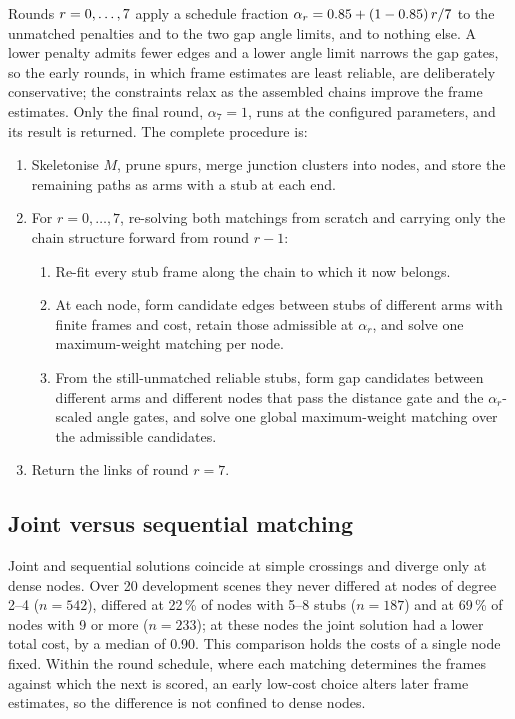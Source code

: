 Rounds $r=0,\ldots,\the\numexpr\PlectaParamRounds-1\relax$ apply a schedule fraction
$\alpha_r=\PlectaParamAnnealStart{}+(1-\PlectaParamAnnealStart{})\,r/\the\numexpr\PlectaParamRounds-1\relax$ to the
unmatched penalties and to the two gap angle limits, and to nothing else. A
lower penalty admits fewer edges and a lower angle limit narrows the gap gates,
so the early rounds, in which frame estimates are least reliable, are
deliberately conservative; the constraints relax as the assembled chains
improve the frame estimates. Only the final round, $\alpha_7=1$, runs at the
configured parameters, and its result is returned. The complete procedure is:
\begin{enumerate}[nosep,leftmargin=1.5em,label=\arabic*.]
  \item Skeletonise $M$, prune spurs, merge junction clusters into nodes, and
        store the remaining paths as arms with a stub at each end.
  \item For $r=0,\ldots,7$, re-solving both matchings from scratch and carrying
        only the chain structure forward from round $r-1$:
  \begin{enumerate}[nosep,leftmargin=1.5em,label=(\alph*)]
    \item Re-fit every stub frame along the chain to which it now belongs.
    \item At each node, form candidate edges between stubs of different arms
          with finite frames and cost, retain those admissible at $\alpha_r$,
          and solve one maximum-weight matching per node.
    \item From the still-unmatched reliable stubs, form gap candidates between
          different arms and different nodes that pass the distance gate and
          the $\alpha_r$-scaled angle gates, and solve one global
          maximum-weight matching over the admissible candidates.
  \end{enumerate}
  \item Return the links of round $r=7$.
\end{enumerate}

\subsection{Joint versus sequential matching}

Joint and sequential solutions coincide at simple crossings and diverge only
at dense nodes. Over 20 development scenes they never differed at nodes of
degree 2--4 ($n=542$), differed at 22\,\% of nodes with 5--8 stubs ($n=187$)
and at 69\,\% of nodes with 9 or more ($n=233$); at these nodes the joint
solution had a lower total cost, by a median of 0.90. This comparison holds
the costs of a single node fixed. Within the round schedule, where each
matching determines the frames against which the next is scored, an early
low-cost choice alters later frame estimates, so the difference is not
confined to dense nodes.

